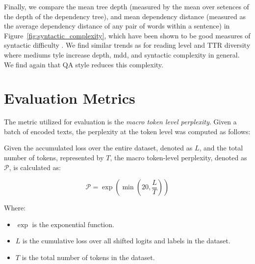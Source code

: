 Finally, we compare the mean tree depth (measured by the mean over setences of the depth of the dependency tree),  and mean dependency distance (measured as the average dependency distance of any pair of words within a sentence) in Figure~\ref{fig:syntactic_complexity}, which have been shown to be good measures of syntactic difficulty \cite{futrell2015large,gibson2000dependency,oya2021three}.    We find similar trends as for reading level and TTR diversity where mediums tyle increase depth, mdd, and syntactic complexity in general.  We find again that QA style reduces this complexity.













































\section{Evaluation Metrics}\label{app_eval}

The metric utilized for evaluation is the \textit{macro token level perplexity}. Given a batch of encoded texts, the perplexity at the token level was computed as follows:

Given the accumulated loss over the entire dataset, denoted as \( L \), and the total number of tokens, represented by \( T \), the macro token-level perplexity, denoted as \( \mathcal{P} \), is calculated as:

\begin{equation}
\mathcal{P} = \exp\left(\min\left(20, \frac{L}{T}\right)\right)
\end{equation}

Where:
\begin{itemize}
    \item \( \exp \) is the exponential function.
    \item \( L \) is the cumulative loss over all shifted logits and labels in the dataset.
    \item \( T \) is the total number of tokens in the dataset.
\end{itemize}

